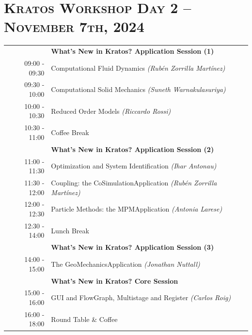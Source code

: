 \documentclass{article}
\begin{document}
\newpage
\section*{\centering \textsc{Kratos Workshop Day 2 -- November 7th, 2024}}

\begin{table}[h]\centering
   \begin{tabularx}{0.85\textwidth}{r|X}
      \toprule%
                    & {\large \textbf{What's New in Kratos? Application Session (1)}} \\%
      09:00 - 09:30 & Computational Fluid Dynamics \textit{(Rubén Zorrilla Martínez)}\\%
      09:30 - 10:00 & Computational Solid Mechanics \textit{(Suneth Warnakulasuriya)}\\%
      10:00 - 10:30 & Reduced Order Models \textit{(Riccardo Rossi)}\\%
      \midrule%
      \rowcolor{SeaGreen3!5!} 10:30 - 11:00 & Coffee Break \\%
      \midrule%
                    & {\large \textbf{What's New in Kratos? Application Session (2)}} \\%
      11:00 - 11:30 & Optimization and System Identification \textit{(Ihar Antonau)} \\%
      11:30 - 12:00 & Coupling: the CoSimulationApplication \textit{(Rubén Zorrilla Martínez)}\\%
      12:00 - 12:30 & Particle Methods: the MPMApplication \textit{(Antonia Larese)}\\%
      \midrule%
      \rowcolor{SeaGreen3!5!} 12:30 - 14:00 & Lunch Break \\%
      \midrule%
                    & {\large \textbf{What's New in Kratos? Application Session (3)}} \\%
      14:00 - 15:00 & The GeoMechanicsApplication \textit{(Jonathan Nuttall)}\\%
      \midrule%
                    & {\large \textbf{What's New in Kratos? Core Session}} \\%
      15:00 - 16:00 & GUI and FlowGraph, Multistage and Register \textit{(Carlos Roig)}\\%
      \midrule%
      16:00 - 18:00 & Round Table \& Coffee \\%
      \bottomrule
   \end{tabularx}
\end{table}
\end{document}
